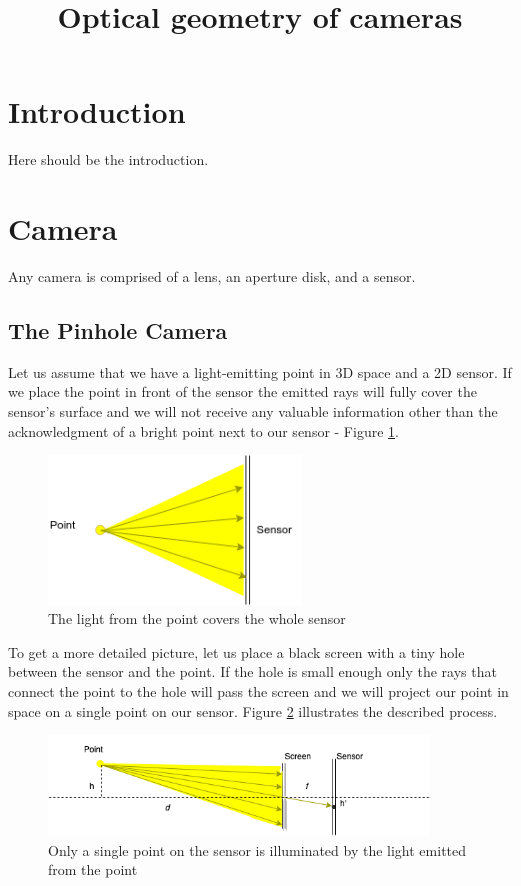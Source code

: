 \documentclass[a4paper,10pt]{article}
\title{Optical geometry of cameras}
\begin{document}
\maketitle



\section{Introduction}
Here should be the introduction.
\section{Camera}


Any camera is comprised of a lens, an aperture disk, and a sensor. 

\subsection{ The Pinhole Camera}

Let us assume that we have a light-emitting point in 3D space and a 2D sensor. If we place the point in front of the sensor the emitted rays will fully cover the sensor's surface and we will not receive any valuable information other than the acknowledgment of a bright point next to our sensor -  Figure \ref{fig:point_and_sensor}.

\begin{figure}[h]
\centering
 \includegraphics[width=0.6\textwidth]{../../images/point.png}
 \caption{The light from the point covers the whole sensor}
 \label{fig:point_and_sensor}
\end{figure}

To get a more detailed picture, let us place a black screen with a tiny hole between the sensor and the point. If the hole is small enough only the rays that connect the point to the hole will pass the screen and we will project our point in space on a single point on our sensor.  Figure \ref{fig:pinhole} illustrates the described process. 
\begin{figure}[h]
\centering
 \includegraphics[width=0.9\textwidth]{../../images/pinhole_point.png}
 \caption{Only a single point on the sensor is illuminated by the light emitted from the point}
 \label{fig:pinhole}
\end{figure}
\end{document}
